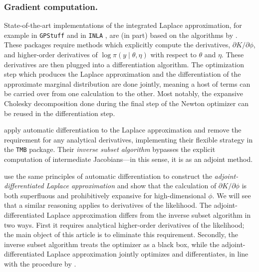 \documentclass[stslayout, noinfoline]{imsart}
\theoremstyle{definition}
\newtheorem{remark}{Remark}
\begin{document}
\subsubsection{Gradient computation.}

State-of-the-art implementations of the integrated Laplace approximation,
for example in \texttt{GPStuff} \citep{Vanhatalo:2013} and in \texttt{INLA} \citep{Rue:2017},
are (in part) based on the algorithms by \citet{Rasmussen:2006}.
These packages require methods which explicitly compute the derivatives, $\partial K / \partial \phi$,
and higher-order derivatives of $\log \pi(y \mid \theta, \eta)$ with respect to $\theta$ and $\eta$.
These derivatives are then plugged into a differentiation algorithm.
The optimization step which produces the Laplace approximation
and the differentiation of the approximate marginal distribution are done jointly,
meaning a host of terms can be carried over from one calculation to the other.
Most notably, the expansive Cholesky decomposition done during the final step of the Newton optimizer can be reused in the differentiation step.

\citet{Kristensen:2016} apply automatic differentiation to the Laplace approximation and remove the requirement for any analytical derivatives, implementing their flexible strategy in the \texttt{TMB} package.
Their \textit{inverse subset algorithm} bypasses the explicit computation of intermediate Jacobians---in this sense, it is as an adjoint method.

\citet{Margossian:2020-laplace} use the same principles of automatic differentiation to construct the \textit{adjoint-differentiated Laplace approximation} and show that the calculation of $\partial K / \partial \phi$ is both superfluous and prohibitively expansive for high-dimensional $\phi$.
We will see that a similar reasoning applies to derivatives of the likelihood.
%
%
The adjoint-differentiated Laplace approximation differs from the inverse subset algorithm in two ways.
First it requires analytical higher-order derivatives of the likelihood;
the main object of this article is to eliminate this requirement.
%
Secondly, the inverse subset algorithm treats the optimizer as a black box, while the adjoint-differentiated Laplace approximation jointly optimizes and differentiates, in line with the procedure by \citet{Rasmussen:2006}.
\end{document}
